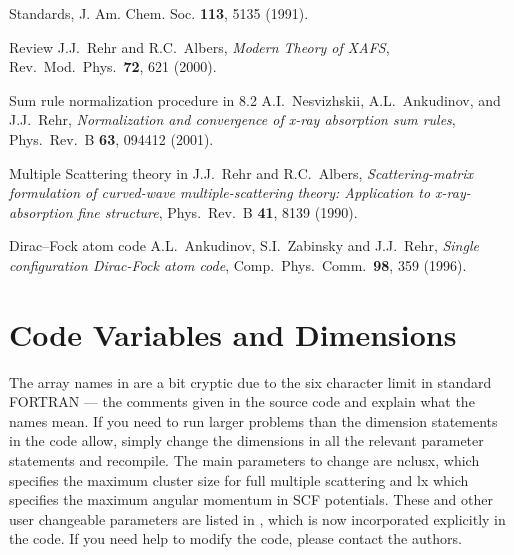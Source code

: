 \documentclass[11pt,oneside]{report} %
\begin{document}
{\begin{Reflist}
{    Standards}, J. Am. Chem. Soc. \textbf{113}, 5135 (1991).
\item[{\feff} Review] J.J.\ Rehr and R.C.\ Albers, \emph{Modern
Theory of XAFS}, Rev.\ Mod.\ Phys.\  \textbf{72}, 621 (2000).
\item[ Sum rule normalization procedure in {\feff}8.2]
A.I.\ Nesvizhskii, A.L.\ Ankudinov, and J.J.\ Rehr,
  \emph{Normalization and convergence of x-ray absorption sum
  rules}, Phys.\ Rev.\ B \textbf{63}, 094412 (2001).
\item[Multiple Scattering theory in {\feff}] J.J.\ Rehr and R.C.\ Albers,
  \emph{Scattering-matrix formulation of curved-wave
    multiple-scattering theory: Application to x-ray-absorption fine
    structure}, Phys.\ Rev.\ B \textbf{41}, 8139 (1990).
\item[Dirac--Fock atom code] A.L.\ Ankudinov, S.I.\ Zabinsky and J.J.\
  Rehr, \emph{Single configuration Dirac-Fock atom code}, Comp.\ Phys.\
  Comm.\ \textbf{98}, 359 (1996).

\end{Reflist}

\chapter{Code Variables and Dimensions}
\label{sec:Appendix-D.-Code}

The array names in {\feff} are a bit cryptic due to the six character
limit in standard FORTRAN --- the comments given
 in the source code and explain what the names mean.  If you need
to run larger problems than the dimension statements in the code
allow, simply change the dimensions in all the relevant parameter
statements and recompile.  The main parameters to change are nclusx,
which specifies the maximum cluster size for full multiple scattering
and lx which specifies the maximum angular momentum in SCF potentials.
These and other user changeable parameters are listed in \file{dim.h},
which is now incorporated explicitly in the code.  If you need help to
modify the {\feff} code, please contact the authors.

\begin{verbatim}


\end{verbatim}}
\end{document}

